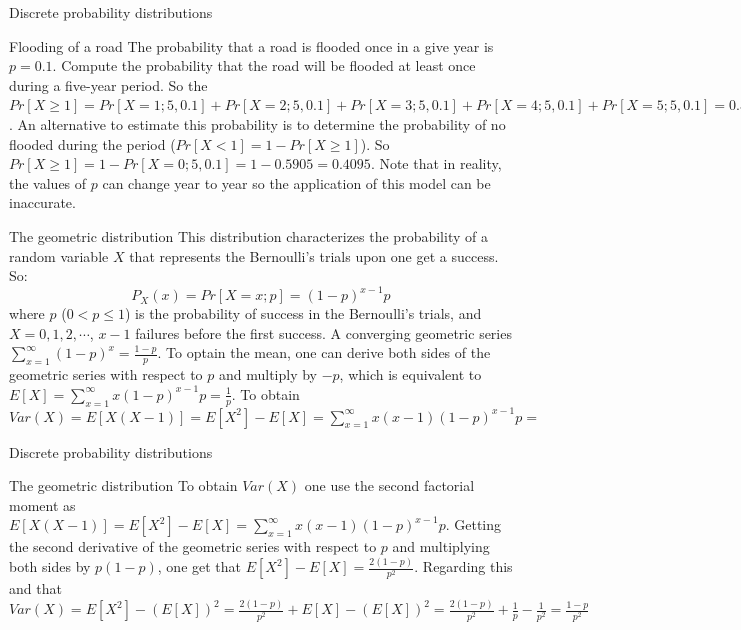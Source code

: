 \documentclass[8pt]{beamer}
\renewcommand{\emph}[1]{\textcolor{myorange}{#1}}
\begin{document}
\begin{frame}{Discrete probability distributions}
\begin{exampleblock}{Flooding of a road} %
        The probability that a road is flooded once in a give year is $p=0.1$. Compute the probability that the road will be flooded at least once during a five-year period. So the $Pr[X \geq 1] = Pr[X = 1;5,0.1] + Pr[X=2;5,0.1] + Pr[X=3;5,0.1]+ Pr[X=4;5,0.1] + Pr[X=5;5,0.1] = 0.3281 + 0.0729 + 0.0081 + 0.0005 + 0.00001 = 0.4095$. An alternative to  estimate this probability is to determine the probability of no flooded during the period ($Pr[X < 1]= 1-Pr[X \geq 1]$). So $Pr[X \geq 1] = 1-Pr[X=0;5,0.1] = 1-0.5905 = 0.4095$. Note that in reality, the values of $p$ can change year to year so the application of this model can be inaccurate. 
    \end{exampleblock}

    \begin{block}{The \alert{geometric} distribution}
        This distribution characterizes the probability of a random variable $X$ that represents the Bernoulli's trials upon one get a success. So:
        \[
            P_X (x) = Pr[X = x; p] = (1-p)^{x-1} p
        \]
        where $p$ ($0 < p \leq 1$) is the probability of success in the Bernoulli's trials, and $X = 0,1,2, \cdots$, $x-1$ failures before the first success. A converging \emph{geometric series} $\sum_{x=1}^{\infty} (1-p)^x = \frac{1-p}{p}$. To optain the mean, one can derive both sides of the geometric series with respect to $p$ and multiply by $-p$, which is equivalent to $E[X] = \sum_{x=1}^\infty x (1-p)^{x-1} p = \frac{1}{p}$. To obtain $Var (X) = E[X(X-1)] = E[X^2] - E[X] = \sum_{x=1}^\infty x(x-1) (1-p)^{x-1} p = 
$
    \end{block}
\end{frame}

\begin{frame}{Discrete probability distributions}
    \begin{block}{The \alert{geometric} distribution}
        To obtain $Var (X)$ one use the second factorial moment as $E[X(X-1)] = E[X^2] - E[X] = \sum_{x=1}^\infty x(x-1) (1-p)^{x-1} p$. Getting the second derivative of the \emph{geometric series} with respect to $p$ and multiplying both sides by $p(1-p)$, one get that $E[X^2] - E[X] = \frac{2(1-p)}{p^2}$. Regarding this and that $Var (X) = E[X^2] - \left(E[X]\right)^2 = \frac{2(1-p)}{p^2}+ E[X]-\left(E[X]\right)^2 = \frac{2(1-p)}{p^2} + \frac{1}{p}- \frac{1}{p^2} = \frac{1-p}{p^2}$ 
    \end{block}
\end{frame}
\end{document}
